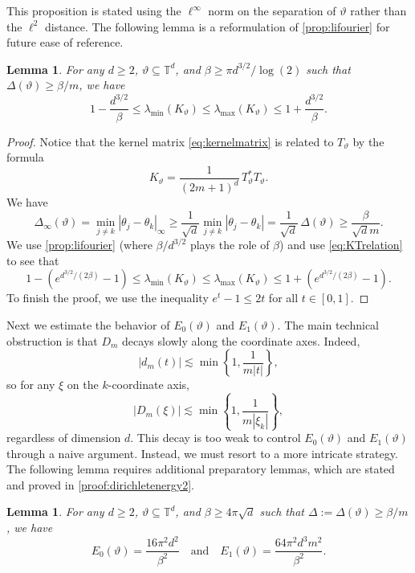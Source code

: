 \documentclass[11pt]{article}
\newtheorem{lemma}[theorem]{Lemma}
\theoremstyle{definition}
\numberwithin{theorem}{section}
\numberwithin{lemma}{section}
\numberwithin{equation}{section}
\def\T{\mathbb{T}}
\renewcommand{\subset}{\subseteq}
\def\andspace{\quad\text{and}\quad}
\numberwithin{equation}{section}
\begin{document}
	This proposition is stated using the $\ell^\infty$ norm on the separation of $\vartheta$ rather than the $\ell^2$ distance. The following lemma is a reformulation of \cref{prop:lifourier} for future ease of reference. 
	
	\begin{lemma}
		\label{lem:lifourier2}
		For any $d\geq 2$, $\vartheta\subset \T^d$, and $\beta\geq \pi d^{3/2} /\log(2)$ such that $\Delta(\vartheta)\geq \beta/m$, we have
		$$
		1-\frac{d^{3/2}}{\beta}
		\leq \lambda_{\min}(K_\vartheta)
		\leq \lambda_{\max}(K_\vartheta)
		\leq 1+ \frac{d^{3/2}}{\beta}.
		$$
	\end{lemma}
	
	\begin{proof}
		Notice that the kernel matrix \eqref{eq:kernelmatrix} is related to $T_\vartheta$ by the formula
		\begin{equation}\label{eq:KTrelation}
			K_\vartheta = \frac 1 {(2m+1)^d} \, T_\vartheta^* T_\vartheta.
		\end{equation}
		We have 
		$$
		\Delta_\infty (\vartheta)
		=\min_{j\ne k} |\theta_j-\theta_k|_{\infty}
		\geq \frac 1 {\sqrt d} \min_{j\ne k} |\theta_j-\theta_k| 
		= \frac 1 {\sqrt d} \, \Delta(\vartheta)
		\geq \frac{\beta}{\sqrt d m}. 
		$$
		We use \cref{prop:lifourier} (where $\beta/d^{3/2}$ plays the role of $\beta$) and use \eqref{eq:KTrelation} to see that
		$$
		1-\left(e^{d^{3/2}/(2\beta)}-1\right)
		\leq \lambda_{\min}(K_\vartheta)
		\leq \lambda_{\max}(K_\vartheta)
		\leq 1+\left(e^{d^{3/2}/(2\beta)}-1\right).
		$$
		To finish the proof, we use the inequality $e^t-1\leq 2t$ for all $t\in [0,1]$.
	\end{proof}
	
	
Next we estimate the behavior of $E_0(\vartheta)$ and $E_1(\vartheta)$. The main technical obstruction is that $D_m$ decays slowly along the coordinate axes. Indeed, 
$$
|d_m(t)|\lesssim \min \left\{1,\frac 1 {m|t|} \right\},
$$
so for any $\xi$ on the $k$-coordinate axis, 
$$
|D_m(\xi)|\lesssim \min \left\{1,\frac 1 {m|\xi_k|} \right\},
$$
regardless of dimension $d$. This decay is too weak to control $E_0(\vartheta)$ and $E_1(\vartheta)$ through a naive argument. Instead, we must resort to a more intricate strategy. The following lemma requires additional preparatory lemmas, which are stated and proved in \cref{proof:dirichletenergy2}.
	
	\begin{lemma}\label{lem:dirichletenergy2}
		For any $d\geq 2$, $\vartheta\subset \T^d$, and $\beta \geq 4\pi \sqrt d$ such that $\Delta:=\Delta(\vartheta)\geq \beta/m$, we have
		$$
		E_0(\vartheta)=\frac{16\pi^2 d^2}{\beta^2} \andspace
		E_1(\vartheta)=\frac{64\pi^2 d^3 m^2}{\beta^2}.
		$$
	\end{lemma}
	
\end{document}
